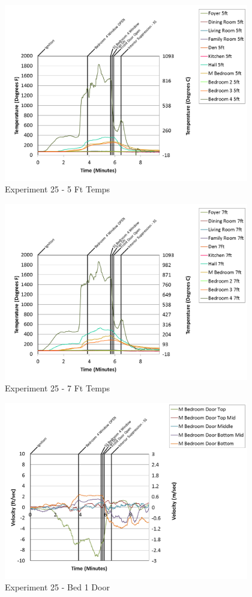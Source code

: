 \documentclass{article}
\begin{document}
\begin{appendices}
\begin{figure}[h!]
	\centering
	\includegraphics[height=3.05in]{0_Images/Results_Charts/Exp_25_Charts/5FtTemps.png}
	\caption{Experiment 25 - 5 Ft Temps}
\end{figure}


\begin{figure}[h!]
	\centering
	\includegraphics[height=3.05in]{0_Images/Results_Charts/Exp_25_Charts/7FtTemps.png}
	\caption{Experiment 25 - 7 Ft Temps}
\end{figure}

\clearpage

\begin{figure}[h!]
	\centering
	\includegraphics[height=3.05in]{0_Images/Results_Charts/Exp_25_Charts/Bed1Door.png}
	\caption{Experiment 25 - Bed 1 Door}
\end{figure}



\end{appendices}
\end{document}
